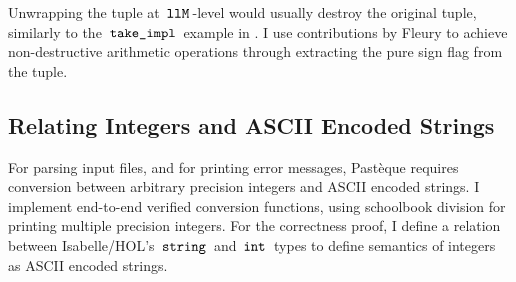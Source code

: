 Unwrapping the tuple at $\,\text{\ttfamily llM}\,$-level would usually destroy the original tuple, similarly to the $\,\text{\ttfamily take\_impl}\,$ example in .
I use contributions by Fleury to achieve non-destructive arithmetic operations through extracting the pure sign flag from the tuple.

\subsection{Relating Integers and ASCII Encoded Strings}\label{sec:relating-integers-and-ascii-encoded-strings}

For parsing input files, and for printing error messages, Pastèque requires conversion between arbitrary precision integers and ASCII encoded strings.
I implement end-to-end verified conversion functions, using schoolbook division for printing multiple precision integers.
For the correctness proof, I define a relation between Isabelle/HOL's $\,\text{\ttfamily string}\,$ and $\,\text{\ttfamily int}\,$ types to define semantics of integers as ASCII encoded strings.

